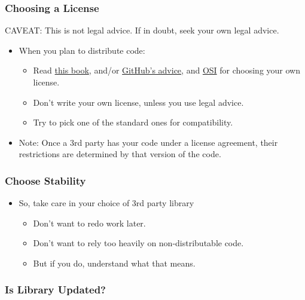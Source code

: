 \subsubsection{Choosing a License}\label{choosing-a-license}

CAVEAT: This is not legal advice. If in doubt, seek your own legal
advice.

\begin{itemize}
\itemsep1pt\parskip0pt
\item
  When you plan to distribute code:

  \begin{itemize}
  \itemsep1pt\parskip0pt
  \item
    Read \href{http://www.oreilly.com/openbook/osfreesoft/book/}{this
    book}, and/or \href{http://choosealicense.com/}{GitHub's advice},
    and \href{http://opensource.org/}{OSI} for choosing your own
    license.
  \item
    Don't write your own license, unless you use legal advice.
  \item
    Try to pick one of the standard ones for compatibility.
  \end{itemize}
\item
  Note: Once a 3rd party has your code under a license agreement, their
  restrictions are determined by that version of the code.
\end{itemize}

\subsubsection{Choose Stability}\label{choose-stability}

\begin{itemize}
\itemsep1pt\parskip0pt
\item
  So, take care in your choice of 3rd party library

  \begin{itemize}
  \itemsep1pt\parskip0pt
  \item
    Don't want to redo work later.
  \item
    Don't want to rely too heavily on non-distributable code.
  \item
    But if you do, understand what that means.
  \end{itemize}
\end{itemize}

\subsubsection{Is Library Updated?}\label{is-library-updated}


